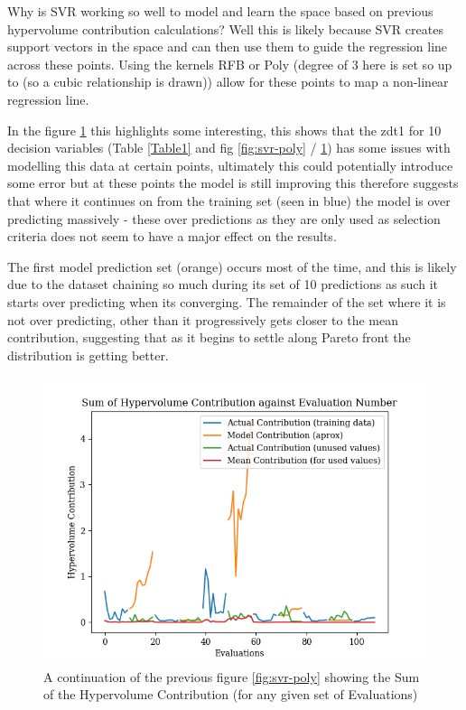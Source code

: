 \documentclass[sigconf,review,nonacm]{acmart}
\begin{document}
\noindent Why is SVR working so well to model and learn the space based on previous hypervolume contribution calculations? Well this is likely because SVR creates support vectors in the space and can then use them to guide the regression line across these points. Using the kernels RFB or Poly (degree of 3 here is set so up to (so a cubic relationship is drawn)) allow for these points to map a non-linear regression line.

In the figure \ref{fig:SVR-2} this highlights some interesting, this shows that the zdt1 for 10 decision variables (Table \ref{Table1} and fig \ref{fig:svr-poly} / \ref{fig:SVR-2}) has some issues with modelling this data at certain points, ultimately this could potentially introduce some error but at these points the model is still improving this therefore suggests that where it continues on from the training set (seen in blue) the model is over predicting massively - these over predictions as they are only used as selection criteria does not seem to have a major effect on the results.  

The first model prediction set (orange) occurs most of the time, and this is likely due to the dataset chaining so much during its set of 10 predictions as such it starts over predicting when its converging. The remainder of the set where it is not over predicting, other than it progressively gets closer to the mean contribution, suggesting that as it begins to settle along Pareto front the distribution is getting better.  

\begin{figure}[H]
    \centering
    \includegraphics[width=0.7\linewidth]{Images/Figure_1_SVRPoly_ZDT1_10_graph.png}
    \caption{A continuation of the previous figure \ref{fig:svr-poly} showing the Sum of the Hypervolume Contribution (for any given set of Evaluations)}
    \label{fig:SVR-2}
\end{figure}
\end{document}
